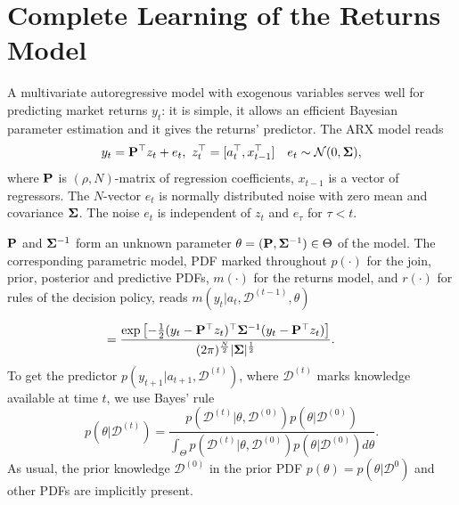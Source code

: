 \section{Complete Learning of the Returns Model} \label{s:model}
A multivariate autoregressive model with exogenous variables serves well for predicting market returns $y_{t}$: it is simple, it allows an efficient Bayesian parameter estimation and it gives the returns' predictor. The ARX model reads
\begin{equation}\label{e:linearmodel}
    y_{t} = \mat{P}^{\top}z_{t} + e_{t},\ z^{\top}_{t}=[a^{\top}_{t},x^{\top}_{t-1}] \quad e_{t} \sim \mathcal{N}(0, \mat{\Sigma}),
\end{equation}
where $\mathbf{P}$ is $(\rho, N)$-matrix of regression coefficients, $x_{t-1}$ is a vector of regressors. The $N$-vector $e_{t}$ is normally distributed noise with zero mean and covariance $\mathbf{\Sigma}$. The noise $e_{t}$ is independent of $z_{t}$ and $e_{\tau}$ for $\tau<t$.

$\mathbf{P}$ and $\mathbf{\Sigma}^{-1}$ form an unknown parameter $\theta = (\mathbf{P}, \mathbf{\Sigma}^{-1})\in \Theta$ of the model. The corresponding parametric model, PDF marked throughout $p(\cdot)$ for the join, prior, posterior and predictive PDFs, $m(\cdot)$ for the returns model, and $r(\cdot)$ for rules of the decision policy, reads $  m(y_{t}|a_{t}, \mathcal{D}^{(t-1)}, \theta)$

\begin{equation}
    \label{e:cPDFlinearmodel}
\hspace*{-4ex}   = \frac{\exp \left[-\frac{1}{2}(y_{t} -\mat{P}^{\top}z_{t})^{\top}\mat{\Sigma}^{-1}(y_{t} -\mat{P}^{\top}z_{t})\right]}{(2\pi)^{\frac{N}{2}}|\mat{\Sigma}|^{\frac{1}{2}}}.
\end{equation}
To get the predictor $p(y_{t+1}|a_{t+1}, \mathcal{D}^{(t)})$,
where $\mathcal{D}^{(t)}$ marks knowledge available at time $t$, we use Bayes' rule
\begin{equation}
\label{e:parametersPDF}
p(\theta|\mathcal{D}^{(t)}) = \frac{p(\mathcal{D}^{(t)}|\theta,\mathcal{D}^{(0)})p(\theta|\mathcal{D}^{(0)})}
{\int_{\Theta}p(\mathcal{D}^{(t)}|\theta,\mathcal{D}^{(0)})p(\theta|\mathcal{D}^{(0)})d\theta}.
\end{equation}
As usual, the prior knowledge $\mathcal{D}^{(0)}$ in the prior PDF $p(\theta)=p(\theta|\mathcal{D}^{0})$ and other PDFs are implicitly present.

